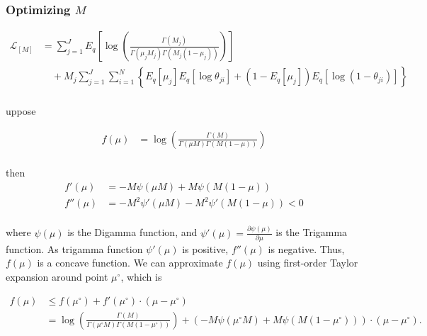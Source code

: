 \documentclass[11pt,reqno]{amsart}
\begin{document}
\subsubsection{Optimizing $ M $}
\begin{equation}
\begin{split}
\label{M}
\mathcal{L}_{{[M]}} 
&= \sum_{j=1}^{J} E_q  \left[ \log \left( \frac{ \Gamma(M_j) } { \Gamma(\mu_j M_j) \Gamma(M_j (1-\mu_j)) }\right) \right] \\ 
&\quad + M_j \sum_{j=1}^{J} \sum_{i=1}^{N} \left\lbrace E_q \left[ \mu_j \right] E_q \left[ \log \theta_{ji} \right] + \left( 1 - E_q\left[ \mu_j \right]  \right) E_q\left[ \log \left( 1 - \theta_{ji}\right) \right] \right\rbrace \\
\end{split}
\end{equation}

uppose

\begin{equation}
\begin{split}
f(\mu) &= \log\left( \frac{\Gamma(M)}{\Gamma(\mu M) \Gamma(M (1-\mu ))}\right) \nonumber \\
\end{split}
\end{equation}

then
\begin{align}
f'(\mu) &= -M \psi (\mu M) + M \psi(M (1-\mu )) \nonumber \\
f''(\mu) &= -M^2 \psi ' (\mu M) - M^2 \psi '(M (1-\mu )) <0 \nonumber \\
\end{align}

where $ \psi(\mu) $ is the Digamma function, and $ \psi'(\mu)= \frac{\partial \psi(\mu)}{\partial \mu}$ is the Trigamma function. As trigamma function $ \psi'(\mu) $ is positive, $ f''(\mu) $ is negative. Thus, $ f(\mu) $ is a concave function. We can approximate $ f(\mu) $ using first-order Taylor expansion around point $ \mu^{\circ} $, which is

\begin{equation}
\begin{split}
f(\mu) &\leq f(\mu^{\circ}) + f'(\mu^{\circ}) \cdot (\mu-\mu^{\circ}) \nonumber \\
&= \log\left( \frac{\Gamma(M)}{\Gamma(\mu^{\circ} M) \Gamma(M (1-\mu^{\circ} ))}\right) + \left( -M \psi (\mu^{\circ} M) + M \psi(M (1-\mu^{\circ} ))\right) \cdot (\mu-\mu^{\circ}).
\end{split}
\end{equation}
\end{document}

